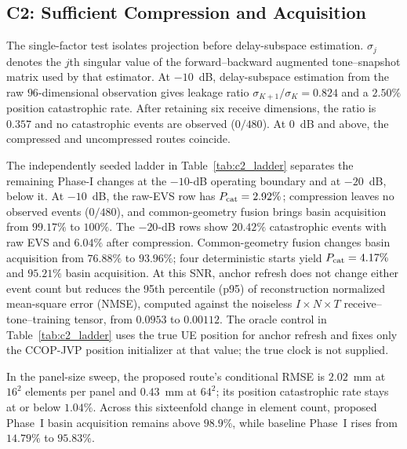 \documentclass[letterpaper,journal]{IEEEtran}
\begin{document}
\subsection{C2: Sufficient Compression and Acquisition}
\label{subsec:res_c2}
The single-factor test isolates projection before delay-subspace estimation.
$\sigma_j$ denotes the $j$th singular value of the forward--backward
augmented tone--snapshot matrix used by that estimator.
At $-10$~dB, delay-subspace estimation from the raw $96$-dimensional
observation gives leakage ratio $\sigma_{K+1}/\sigma_K=0.824$ and a $2.50\%$
position catastrophic rate.
After retaining six receive dimensions, the ratio is $0.357$ and no
catastrophic events are observed ($0/480$). At $0$~dB and above, the
compressed and uncompressed routes coincide.

The independently seeded ladder in Table~\ref{tab:c2_ladder} separates the
remaining Phase-I changes at the $-10$-dB operating boundary and at
$-20$~dB, below it. At $-10$~dB, the raw-EVS row has $P_{\rm cat}=2.92\%$;
compression leaves no observed events ($0/480$), and common-geometry fusion
brings basin acquisition from $99.17\%$ to $100\%$. The $-20$-dB rows show
$20.42\%$ catastrophic events with raw EVS and $6.04\%$ after compression.
Common-geometry fusion changes basin acquisition from $76.88\%$ to
$93.96\%$; four deterministic starts yield $P_{\rm cat}=4.17\%$ and
$95.21\%$ basin acquisition. At this SNR, anchor refresh does not change
either event count but reduces the 95th percentile (p95) of reconstruction
normalized mean-square error (NMSE), computed against the noiseless
$I\times N\times T$ receive--tone--training tensor, from $0.0953$ to
$0.00112$. The oracle control in Table~\ref{tab:c2_ladder} uses the true UE
position for anchor refresh and fixes only the CCOP-JVP position initializer
at that value; the true clock is not supplied.

In the panel-size sweep, the proposed route's conditional RMSE is $2.02$~mm
at $16^2$ elements per panel and $0.43$~mm at $64^2$; its position
catastrophic rate stays at or below $1.04\%$. Across this sixteenfold change
in element count, proposed Phase~I basin acquisition remains above $98.9\%$,
while baseline Phase~I rises from $14.79\%$ to $95.83\%$.
\end{document}
